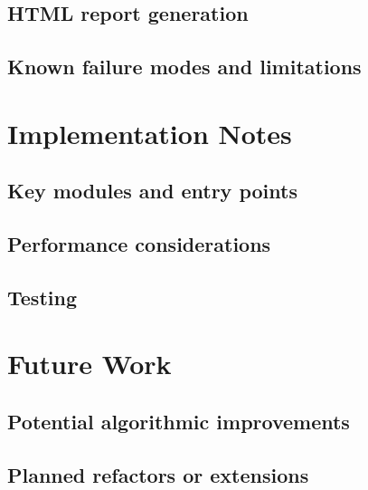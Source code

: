 \documentclass[11pt,a4paper]{article}
\begin{document}
  \subsection{HTML report generation}
  \subsection{Known failure modes and limitations}

\section{Implementation Notes}
  \subsection{Key modules and entry points}
  \subsection{Performance considerations}
  \subsection{Testing}

\section{Future Work}
  \subsection{Potential algorithmic improvements}
  \subsection{Planned refactors or extensions}


\end{document}
